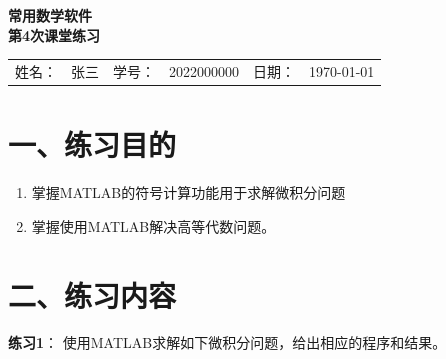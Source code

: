 \documentclass[zihao=-4]{ctexart}
\begin{document}
\begin{center}
{ \textbf{ 常用数学软件 \\ 第4次课堂练习}}
\\ \noindent
\begin{tabular}{cccccc}
	姓名：&   张三  &  学号：& 2022000000  &日期：  & \today 
\end{tabular}
\end{center}
	
\section*{一、练习目的}

\begin{enumerate}
	\item 掌握MATLAB的符号计算功能用于求解微积分问题 \vspace*{-1em}
	\item 掌握使用MATLAB解决高等代数问题。 \vspace*{-1em}
\end{enumerate}

\section*{二、练习内容}

\noindent
\textbf{练习1}： 使用MATLAB求解如下微积分问题，给出相应的程序和结果。
\end{document}
